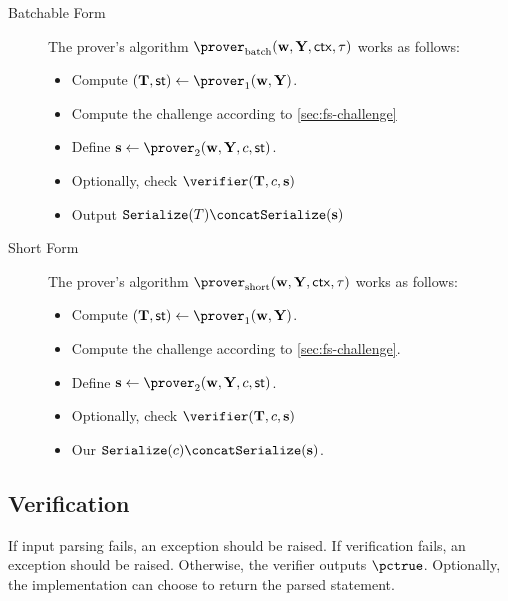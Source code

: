 \documentclass[runningheads,11pt]{article}
\newcommand{\serialize}{\texttt{Serialize}}
\begin{document}
\begin{description}
\item[Batchable Form]
The prover's algorithm $\batchprover(\vec \witness, \vec \statement,\ctx, \stag)$ works as follows:
\begin{itemize}
\item
  Compute $(\vec \commitment,\st)\gets\prover_1(\vec \witness, \vec \statement)$.
\item
  Compute the challenge according to \cref{sec:fs-challenge}
\item
  Define $\vec \response\gets\prover_2(\vec \witness, \vec \statement,\challenge,\st)$.
  \item Optionally, check $\verifier(\vec \commitment, \challenge, \vec \response)$
\item
  Output $\serialize(\commitment) \concat \serialize(\vec \response)$
\end{itemize}

\item[Short Form]
The prover's algorithm $\shortprover(\vec \witness, \vec \statement,\ctx, \stag)$ works as follows:
\begin{itemize}
  \item
    Compute $(\vec \commitment,\st)\gets\prover_1(\vec \witness, \vec \statement)$.
  \item
    Compute the challenge according to \cref{sec:fs-challenge}.
  \item
    Define $\vec \response\gets\prover_2(\vec \witness,\vec \statement, \challenge,\st)$.
    \item Optionally, check $\verifier(\vec \commitment, \challenge, \vec \response)$
  \item
  Our $\serialize(c) \concat \serialize(\vec s)$.
\end{itemize}
\end{description}

\subsection{Verification}

If input parsing fails, an exception should be raised.
If verification fails, an exception should be raised.
Otherwise, the verifier outputs $\pctrue$. Optionally, the implementation can choose to return the parsed statement.
\end{document}
